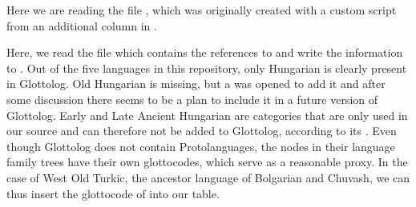 \documentclass[letterpaper,10pt,english]{sphinxmanual}
\begin{document}
\begin{sphinxVerbatim}[commandchars=\\\{\}]
  
     
  \PYG{p}{[}\PYG{p}{]} \PYG{p}{[}\PYG{p}{]}    
\end{sphinxVerbatim}

\sphinxAtStartPar
Here we are reading the file , which was originally
created with a custom script from an additional column in .

\begin{sphinxVerbatim}[commandchars=\\\{\}]
  
\end{sphinxVerbatim}

\sphinxAtStartPar
Here, we read the file  which contains the references to
 and write the information to
. Out of the five languages in this repository, only
Hungarian is clearly present in Glottolog. Old Hungarian is missing, but a
 was opened to
add it and after some discussion there seems to be a plan to include it in a
future version of Glottolog. Early and Late Ancient Hungarian are categories
that are only used in our source and can therefore not be added to Glottolog,
according to its . Even
though Glottolog does not contain Proto\sphinxhyphen{}languages, the nodes in their
language
family trees have their own glotto\sphinxhyphen{}codes, which serve as a reasonable proxy.
In the case of West Old Turkic, the ancestor language of Bolgarian and Chuvash,
we can thus insert the glotto\sphinxhyphen{}code of  into our table.
\end{document}
